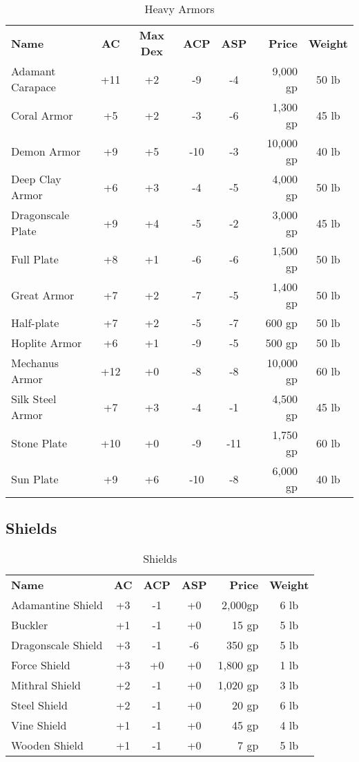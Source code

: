 \begin{table}[htb]
\caption{Heavy Armors}
\centering
\begin{tabular}{l *{4}{c} r c}
\textbf{Name} & \textbf{AC} & \textbf{Max Dex} & \textbf{ACP} & \textbf{ASP} & \textbf{Price} & \textbf{Weight}\\
Adamant Carapace & +11 & +2 & -9 & -4 & 9,000 gp & 50 lb\\
Coral Armor & +5 & +2 & -3 & -6 & 1,300 gp & 45 lb\\
Demon Armor & +9 & +5 & -10 & -3 & 10,000 gp & 40 lb\\
Deep Clay Armor & +6 & +3 & -4 & -5 & 4,000 gp & 50 lb\\
Dragonscale Plate & +9 & +4 & -5 & -2 & 3,000 gp & 45 lb\\
Full Plate & +8 & +1 & -6 & -6 & 1,500 gp & 50 lb\\
Great Armor & +7 & +2 & -7 & -5 & 1,400 gp & 50 lb\\
Half-plate & +7 & +2 & -5 & -7 & 600 gp & 50 lb\\
Hoplite Armor & +6 & +1 & -9 & -5 & 500 gp & 50 lb\\
Mechanus Armor & +12 & +0 & -8 & -8 & 10,000 gp & 60 lb\\
Silk Steel Armor & +7 & +3 & -4 & -1 & 4,500 gp & 45 lb\\
Stone Plate & +10 & +0 & -9 & -11 & 1,750 gp & 60 lb\\
Sun Plate & +9 & +6 & -10 & -8 & 6,000 gp & 40 lb\\
\end{tabular}
\end{table}


\subsection{Shields}

\begin{table}[htb]
\caption{Shields}
\centering
\begin{tabular}{l *{3}{c} r c}
\textbf{Name} & \textbf{AC} & \textbf{ACP} & \textbf{ASP} & \textbf{Price} & \textbf{Weight}\\
Adamantine Shield & +3 & -1 & +0 & 2,000gp & 6 lb\\
Buckler & +1 & -1 & +0 & 15 gp & 5 lb\\
Dragonscale Shield & +3 & -1 & -6 & 350 gp & 5 lb\\
Force Shield & +3 & +0 & +0 & 1,800 gp & 1 lb\\
Mithral Shield & +2 & -1 & +0 & 1,020 gp & 3 lb\\
Steel Shield & +2 & -1 & +0 & 20 gp & 6 lb\\
Vine Shield & +1 & -1 & +0 & 45 gp & 4 lb\\
Wooden Shield & +1 & -1 & +0 & 7 gp & 5 lb\\
\end{tabular}
\end{table}

